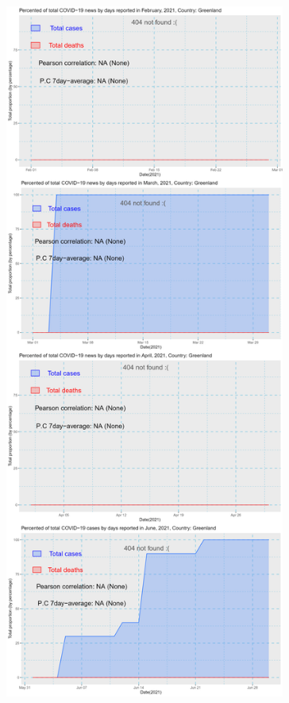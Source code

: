 \documentclass[a4paper]{article}
\theoremstyle{definition}
\begin{document}
\begin{enumerate}[i)]
\begin{enumerate}[1)]
\begin{figure}[H]
				\includegraphics[height=23cm,width=13cm]{images/9.4.png}
			\end{figure}
			\begin{figure}[H]
				\centering

\end{figure}
\end{enumerate}
\end{enumerate}
\end{document}
